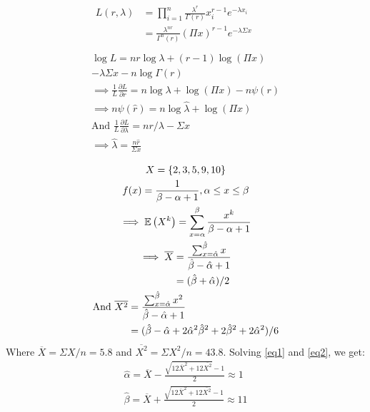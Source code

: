 \documentclass[twocolumn]{article}
\numberwithin{equation}{section}
\begin{document}
\begin{gather}
\begin{aligned}
L(r,\lambda)&=\prod_{i=1}^n\frac{\lambda^r}{\Gamma(r)}x_i^{r-1}e^{-\lambda x_i}\nonumber\\
&=\frac{\lambda^{nr}}{\Gamma^n(r)}(\Pi x)^{r-1}e^{-\lambda\Sigma x}\nonumber\\
\end{aligned}\\
\log L=nr\log\lambda+(r-1)\log(\Pi x)\nonumber\\
-\lambda\Sigma x-n\log\Gamma(r)\nonumber\\
\implies \frac{1}{L}\frac{\partial L}{\partial r}=n\log\lambda+\log(\Pi x)-n\psi(r)\nonumber\\
\implies n\psi(\hat r)=n\log\hat\lambda+\log(\Pi x)\\
\text{And }\frac{1}{L}\frac{\partial L}{\partial \lambda}=nr/\lambda-\Sigma x\nonumber\\
\implies \hat\lambda=\frac{n\hat r}{\Sigma x}
\end{gather}

\newpage

\begin{gather}
X=\{2,3,5,9,10\}\nonumber\\
f(x)=\frac{1}{\beta-\alpha+1},\alpha\le x\le\beta\nonumber\\
\implies \mathbb{E}\left(X^k\right)=\sum_{x=\alpha}^\beta {\frac{x^k}{\beta-\alpha+1}}\nonumber\\
\begin{aligned}
\implies \overline X
&=\frac{\sum_{x=\hat\alpha}^{\hat\beta} x}{\hat\beta-\hat\alpha+1}\\
&=(\hat\beta+\hat\alpha)/2\label{eq1}\\
\end{aligned}\\
\begin{aligned}
\text{And }\overline{X^2}
&=\frac{\sum_{x=\hat\alpha}^{\hat\beta} x^2}{\hat\beta-\hat\alpha+1}\\
&=(\hat\beta-\hat\alpha+2\hat\alpha^2\hat\beta^2+2\hat\beta^2+2\hat\alpha^2)/6\label{eq2}
\end{aligned}
\end{gather}
Where $\overline X=\Sigma X/n=5.8$ and $\overline{X^2}=\Sigma X^2/n=43.8$. Solving \ref{eq1} and \ref{eq2}, we get:\begin{gather*}
\hat\alpha=\overline X-\frac{\sqrt{12\overline{X}^2+12\overline{X^2}}-1}{2}\approx 1\\
\hat\beta=\overline X+\frac{\sqrt{12\overline{X}^2+12\overline{X^2}}-1}{2}\approx 11
\end{gather*}
\end{document}
